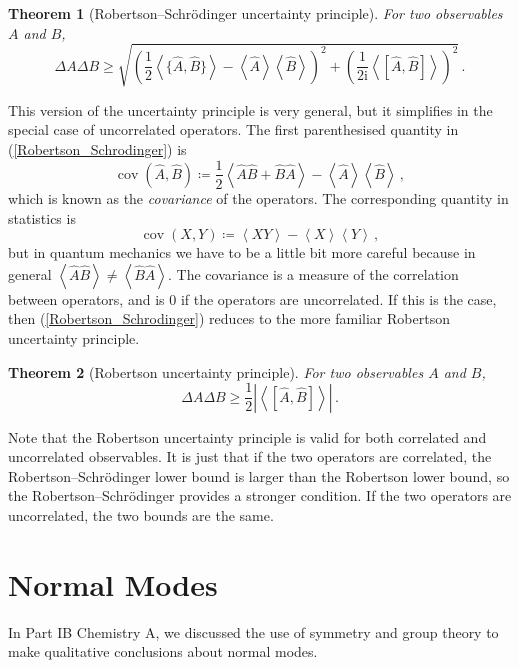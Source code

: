 \documentclass{article}
\theoremstyle{plain}\theoremheaderfont{\normalfont\itshape}\theorembodyfont{\rmfamily}\theoremseparator{.}\newtheorem*{rem}{Remark}\newtheorem*{ex}{Example}\newtheorem*{proof}{Proof}\newtheorem*{altp}{Alternative proof}
\theoremstyle{plain}\theoremheaderfont{\normalfont\bfseries}\theorembodyfont{\rmfamily}\theoremseparator{.}\newtheorem{thm}{Theorem}[section]\newtheorem{lem}[thm]{Lemma}\newtheorem{prop}[thm]{Proposition}\newtheorem*{cor}{Corollary}\newtheorem{defn}[thm]{Definition}\newtheorem{clm}[thm]{Claim}\newtheorem{clminproof}{Claim}
\theoremstyle{break}\theoremheaderfont{\normalfont\itshape}\theorembodyfont{\rmfamily}\theoremseparator{.\medskip}\newtheorem*{proofskip}{Proof}\newtheorem*{exs}{Examples}\newtheorem*{rems}{Remarks}
\theoremstyle{break}\theoremheaderfont{\normalfont\bfseries}\theorembodyfont{\rmfamily}\theoremseparator{.\medskip}\newtheorem{lemskip}[thm]{Lemma}\newtheorem{defnskip}[thm]{Definition}\newtheorem{propskip}[thm]{Proposition}\newtheorem{thmskip}[thm]{Theorem}
\numberwithin{equation}{section}
\newcommand{\ii}{\mathrm{i}}
\newcommand{\eval}[1]{\left\langle #1 \right\rangle}
\newcommand{\abs}[1]{\left| #1 \right|}
\DeclareMathOperator{\cov}{cov}
\begin{document}
    \begin{thm}[Robertson--Schr\"{o}dinger uncertainty principle]
        For two observables \(A\) and \(B\),
        \begin{equation}\label{Robertson_Schrodinger}
            \Delta A\Delta B\ge\sqrt{\left(\frac{1}{2}\eval{\{\hat{A},\hat{B}\}}-\eval{\hat{A}}\eval{\hat{B}}\right)^2+\left(\frac{1}{2\ii}\eval{[\hat{A},\hat{B}]}\right)^2}\,.
        \end{equation}
    \end{thm}

    This version of the uncertainty principle is very general, but it simplifies in the special case of uncorrelated operators. The first parenthesised quantity in (\ref{Robertson_Schrodinger}) is
    \begin{equation}
        \cov(\hat{A},\hat{B})\coloneqq\frac{1}{2}\eval{\hat{A}\hat{B}+\hat{B}\hat{A}}-\eval{\hat{A}}\eval{\hat{B}}\,,
    \end{equation}
    which is known as the \textit{covariance} of the operators. The corresponding quantity in statistics is
    \begin{equation}
        \cov(X,Y)\coloneqq\eval{XY}-\eval{X}\eval{Y}\,,
    \end{equation}
    but in quantum mechanics we have to be a little bit more careful because in general \(\eval{\hat{A}\hat{B}}\ne\eval{\hat{B}\hat{A}}\). The covariance is a measure of the correlation between operators, and is \(0\) if the operators are uncorrelated. If this is the case, then (\ref{Robertson_Schrodinger}) reduces to the more familiar Robertson uncertainty principle.

    \begin{thm}[Robertson uncertainty principle]
        For two observables \(A\) and \(B\),
        \begin{equation}
            \Delta A\Delta B\ge\frac{1}{2}\abs{\eval{[\hat{A},\hat{B}]}}\,.
        \end{equation}
    \end{thm}

    Note that the Robertson uncertainty principle is valid for both correlated and uncorrelated observables. It is just that if the two operators are correlated, the Robertson--Schr\"{o}dinger lower bound is larger than the Robertson lower bound, so the Robertson--Schr\"{o}dinger provides a stronger condition. If the two operators are uncorrelated, the two bounds are the same.

    \newpage
    \section{Normal Modes}
    In Part IB Chemistry A, we discussed the use of symmetry and group theory to make qualitative conclusions about normal modes.
\end{document}
